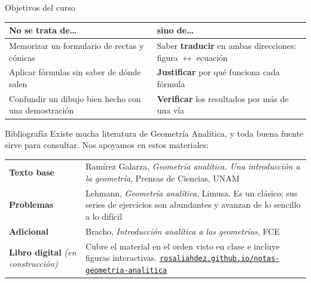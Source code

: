 \documentclass[aspectratio=169,10pt]{beamer}
\newcommand{\destaca}[1]{%
  \par\vspace{3pt}\noindent
  \colorbox{turquesaClaro}{%
    \parbox{\dimexpr\linewidth-2\fboxsep\relax}{\vspace{3pt}#1\vspace{3pt}}}%
  \par\vspace{3pt}}
\begin{document}
\begin{frame}{Objetivos del curso}
  \begin{center}
  {\small
  \begin{tabular}{@{}p{6.4cm}p{6.6cm}@{}}
    \toprule
    \textcolor{rojoAc}{\textbf{No se trata de\ldots}} &
    \textcolor{verdeOk}{\textbf{sino de\ldots}} \\
    \midrule
    Memorizar un formulario de rectas y cónicas &
    Saber \textbf{traducir} en ambas direcciones:
    figura $\leftrightarrow$ ecuación \\[8pt]
    Aplicar fórmulas sin saber de dónde salen &
    \textbf{Justificar} por qué funciona cada fórmula \\[8pt]
    Confundir un dibujo bien hecho con una demostración &
    \textbf{Verificar} los resultados por más de una vía \\
    \bottomrule
  \end{tabular}}
  \end{center}
  
  \vspace{0.3cm}
\end{frame}

\begin{frame}{Bibliografía}
  Existe mucha literatura de Geometría Analítica, y toda buena fuente
  sirve para consultar. Nos apoyamos en estos materiales:

  \vspace{0.3cm}
  \begin{center}
  {\small
  \begin{tabular}{@{}p{2.5cm}p{7.6cm}@{}}
    \toprule
    \textbf{Texto base} & Ramírez Galarza, \textit{Geometría analítica.
      Una introducción a la geometría}, Prensas de Ciencias, UNAM \\[6pt]
    \textbf{Problemas} & Lehmann, \textit{Geometría analítica}, Limusa.
      Es un clásico; sus series de ejercicios son abundantes y avanzan
      de lo sencillo a lo difícil \\[6pt]
    \textbf{Adicional} & Bracho, \textit{Introducción analítica
      a las geometrías}, FCE \\[6pt]
    \textbf{Libro digital}\newline
      {\footnotesize\itshape (en construcción)} & Cubre el material en el orden visto en
      clase e incluye figuras interactivas.\newline
      {\footnotesize\href{https://rosaliahdez.github.io/notas-geometria-analitica/}{\texttt{rosaliahdez.github.io/notas-geometria-analitica}}} \\
    \bottomrule
  \end{tabular}}
  \end{center}

\end{frame}
\end{document}
